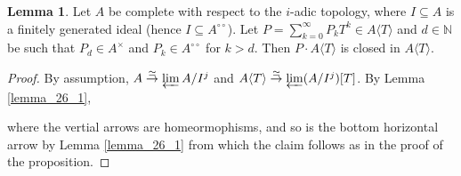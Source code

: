 \documentclass[10pt]{article}
\numberwithin{equation}{section}
\theoremstyle{definition}
\newtheorem{lemma}{Lemma}[subsection]
\newcommand{\N}[0]{\mathbb{N}}
\newcommand{\dcirc}[0]{{\circ\circ}}
\begin{document}
\begin{lemma}
    \label{lemma_26_2}
    Let $A$ be complete with respect to the $i$-adic topology, where $I\subseteq A$ is a finitely generated ideal (hence $I\subseteq A^\dcirc$). 
    Let $P = \sum_{k=0}^\infty P_k T^k\in A\langle T\rangle$ and $d\in\N$ be such that $P_d\in A^\times$ and $P_k\in A^\dcirc$ for $k>d$. Then $P\cdot A\langle T\rangle$ is closed in $A\langle T\rangle$.
\end{lemma}

\begin{proof}
    By assumption, $A\stackrel{\simeq}{\to}\varprojlim A/I^j$ and $A\langle T\rangle\stackrel{\simeq}{\to}\varprojlim(A/I^j)[T]$. By Lemma \ref{lemma_26_1}, 
    \begin{center}
    \end{center}
    where the vertial arrows are homeormophisms, and so is the bottom horizontal arrow by Lemma \ref{lemma_26_1} from which the claim follows as in the proof of the proposition.
\end{proof}
\end{document}
